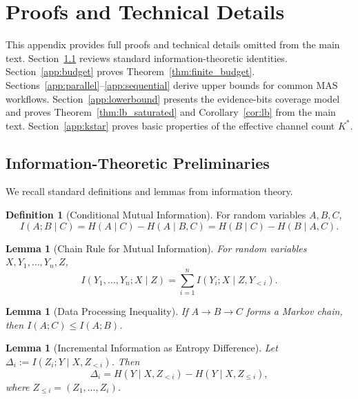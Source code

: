 \documentclass{article}
\theoremstyle{plain}
\newtheorem{lemma}[theorem]{Lemma}
\theoremstyle{definition}
\newtheorem{definition}[theorem]{Definition}
\theoremstyle{remark}
\begin{document}






\newpage
\appendix
\onecolumn

\section{Proofs and Technical Details}
\label{sec:appendix}

This appendix provides full proofs and technical details omitted from the main text.
Section~\ref{app:prelim} reviews standard information-theoretic identities.
Section~\ref{app:budget} proves Theorem~\ref{thm:finite_budget}.
Sections~\ref{app:parallel}--\ref{app:sequential} derive upper bounds for common MAS workflows.
Section~\ref{app:lowerbound} presents the evidence-bits coverage model and proves
Theorem~\ref{thm:lb_saturated} and Corollary~\ref{cor:lb} from the main text.
Section~\ref{app:kstar} proves basic properties of the effective channel count $K^*$.



\subsection{Information-Theoretic Preliminaries}
\label{app:prelim}

We recall standard definitions and lemmas from information theory.

\begin{definition}[Conditional Mutual Information]
For random variables $A,B,C$,
\begin{equation}
I(A;B\mid C)
= H(A\mid C)-H(A\mid B,C)
= H(B\mid C)-H(B\mid A,C).
\end{equation}
\end{definition}

\begin{lemma}[Chain Rule for Mutual Information]
\label{lem:chain-rule}
For random variables $X,Y_1,\ldots,Y_n,Z$,
\begin{equation}
I(Y_1,\ldots,Y_n;X\mid Z)
= \sum_{i=1}^n I(Y_i;X\mid Z,Y_{<i}).
\end{equation}
\end{lemma}

\begin{lemma}[Data Processing Inequality]
\label{lem:dpi}
If $A\to B\to C$ forms a Markov chain, then $I(A;C)\le I(A;B)$.
\end{lemma}

\begin{lemma}[Incremental Information as Entropy Difference]
\label{lem:delta-entropy}
Let $\Delta_i := I(Z_i;Y\mid X,Z_{<i})$. Then
\begin{equation}
\Delta_i
= H(Y\mid X,Z_{<i}) - H(Y\mid X,Z_{\le i}),
\end{equation}
where $Z_{\le i}=(Z_1,\ldots,Z_i)$.
\end{lemma}
\end{document}
